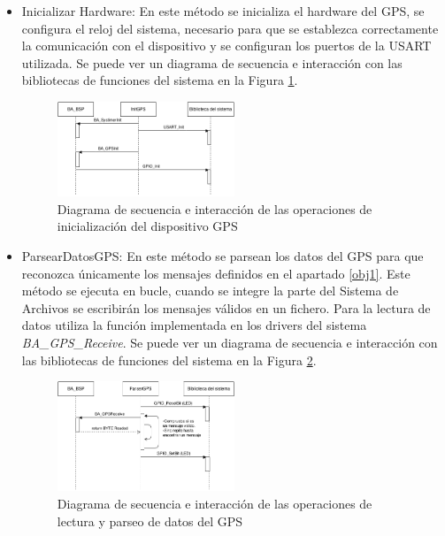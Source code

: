 \begin{itemize}
\item Inicializar Hardware: En este método se inicializa el hardware del GPS, se configura el reloj del sistema, necesario para que se establezca correctamente la comunicación con el dispositivo y se configuran los puertos de la \acs{USART} utilizada. Se puede ver un diagrama de secuencia e interacción con las bibliotecas de funciones del sistema en la Figura \ref{fig:initGPS}.\\

\begin{figure}[!h]
\begin{center}
\includegraphics[width=0.5\textwidth]{figs/initGPS.png}
\caption{Diagrama de secuencia e interacción de las operaciones de inicialización del dispositivo GPS}
\label{fig:initGPS}
\end{center}
\end{figure}

\item ParsearDatosGPS: En este método se parsean los datos del GPS para que reconozca únicamente los mensajes definidos en el apartado \ref{obj1}. Este método se ejecuta en bucle, cuando se integre la parte del Sistema de Archivos se escribirán los mensajes válidos en un fichero. Para la lectura de datos utiliza la función implementada en los drivers del sistema \textit{BA\_GPS\_Receive}. Se puede ver un diagrama de secuencia e interacción con las bibliotecas de funciones del sistema en la Figura \ref{fig:parserGPS}.\\

\begin{figure}[!h]
\begin{center}
\includegraphics[width=0.5\textwidth]{figs/parserGPS.png}
\caption{Diagrama de secuencia e interacción de las operaciones de lectura y parseo de datos del GPS}
\label{fig:parserGPS}
\end{center}
\end{figure}

\end{itemize}

